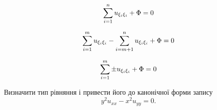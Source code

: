 \begin{th_equation}
	\begin{equation}
		\displaystyle\sum\limits_{i=1}^n u_{\xi_i\xi_i} + \Phi = 0
	\end{equation}
\end{th_equation}

\begin{th_equation}
	\begin{equation}
		\displaystyle\sum\limits_{i=1}^m u_{\xi_i\xi_i} - \displaystyle\sum\limits_{i=m+1}^n u_{\xi_i\xi_i} + \Phi = 0
	\end{equation}
\end{th_equation}

\begin{th_equation}
	\begin{equation}
		\displaystyle\sum\limits_{i=1}^m \pm u_{\xi_i\xi_i} + \Phi = 0
	\end{equation}
\end{th_equation}

\newpage

\begin{example}
	Визначити тип рівняння і привести його до канонічної форми запису
	\begin{equation*}
		y^2 u_{xx} - x^2 u_{yy} = 0.
	\end{equation*}
\end{example}

